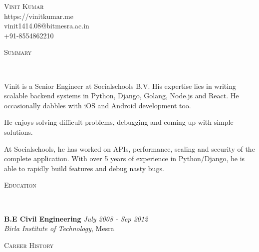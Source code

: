 \documentclass[9pt]{article}
\newenvironment{changemargin}[2]{%
  \begin{list}{}{%
    \setlength{\topsep}{0pt}%
    \setlength{\leftmargin}{#1}%
    \setlength{\rightmargin}{#2}%
    \setlength{\listparindent}{\parindent}%
    \setlength{\itemindent}{\parindent}%
    \setlength{\parsep}{\parskip}%
  }%
  \item[]}{\end{list}
}
\newcommand{\lineover}{
    \begin{changemargin}{-0.05in}{-0.05in}
        \vspace*{-8pt}
        \hrulefill \\
        \vspace*{-2pt}
    \end{changemargin}
}
\newcommand{\header}[1]{
    \begin{changemargin}{-0.5in}{-0.5in}
        \scshape{#1}\\
    \lineover
    \end{changemargin}
}
\newcommand{\contact}[4]{
    \begin{changemargin}{-0.5in}{-0.5in}
        \begin{center}
            {\Large \scshape {#1}}\\ \smallskip
            {#2}\\ \smallskip
            {#3}\\ \smallskip
            {#4}\smallskip
        \end{center}
    \end{changemargin}
}
\newenvironment{body} {
    \vspace*{-16pt}
    \begin{changemargin}{-0.25in}{-0.5in}
  }
    {\end{changemargin}
}
\begin{document}
\contact{Vinit Kumar}{https://vinitkumar.me}{vinit1414.08@bitmesra.ac.in}{+91-8554862210}


\header{Summary}

\begin{body}
    \vspace{14pt}
Vinit is a Senior Engineer at Socialschools B.V. His expertise lies in writing scalable backend systems in Python, Django, Golang, Node.js and React. He occasionally dabbles with iOS and Android development too.

He enjoys solving difficult problems, debugging and coming up with simple solutions.

At Socialschools, he has worked on APIs, performance, scaling and security of the complete application. With over 5 years of experience in Python/Django, he is able to rapidly build features and debug nasty bugs.
\end{body}

\smallskip


\header{Education}

\begin{body}
    \vspace{14pt}
    \textbf{B.E Civil Engineering }{} \hfill \emph{July 2008 - Sep 2012}{} \\
    \emph{Birla Institute of Technology}, Mesra{} \\
\end{body}

\smallskip


\header{Career History}
\end{document}

